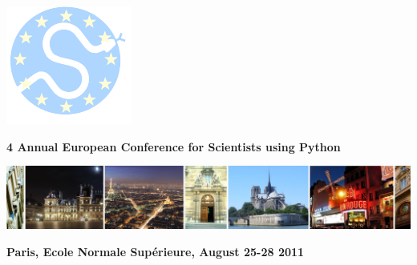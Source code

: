 \documentclass[slidestop,11pt,compress,serif]{beamer} %
\newcommand{\vfillll}{\vfilll\vfilll\vfilll\vfilll\vfilll\vfilll\vfilll\vfilll\vfilll\vfilll\vfilll\vfilll\vfilll\vfilll\vfilll\vfilll\vfilll\vfilll\vfilll\vfilll\vfilll\vfilll\vfilll\vfilll\vfilll\vfilll\vfilll\vfilll\vfilll\vfilll\vfilll\vfilll\vfilll\vfilll\vfilll\vfilll\vfilll\vfilll\vfilll\vfilll}
\begin{document}
\newlength\thiscolumnheight

 {%
\rule{0pt}{0.72\paperheight}%
\centerline{%
\includegraphics[width=0.6\paperwidth]{euroscipy_back}%
}%
}%

\begin{frame}[plain,t]
\sffamily

\centerline{%
%
}

\smallskip
\centerline{\bfseries\textcolor{structurecolor}{\huge
4 Annual European Conference for Scientists using Python}}

\includegraphics[width=\linewidth]{banner}

\bigskip
\centerline{\bfseries\Huge
Paris, Ecole Normale Supérieure, August 25-28 2011}

\vfillll%


\end{frame}
\end{document}
